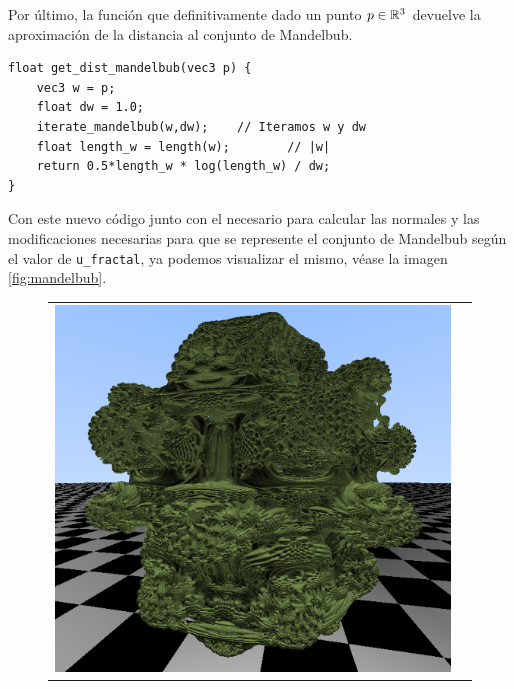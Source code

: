 Por último, la función que definitivamente dado un punto $p\in\mathbb{R}^3$ devuelve la aproximación de la distancia al conjunto de Mandelbub. 

\begin{lstlisting}
float get_dist_mandelbub(vec3 p) {
    vec3 w = p;
    float dw = 1.0;
    iterate_mandelbub(w,dw);    // Iteramos w y dw
    float length_w = length(w);        // |w|
    return 0.5*length_w * log(length_w) / dw;
}
\end{lstlisting}

Con este nuevo código junto con el necesario para calcular las normales y las modificaciones necesarias para que se represente el conjunto de Mandelbub según el valor de \verb|u_fractal|, ya podemos visualizar el mismo, véase la imagen \ref{fig:mandelbub}. 

\begin{figure}[ht]
    \centering
    \begin{tabular}{cc}
        \includegraphics[scale=0.34]{img/C8/mandelbub-1.png} &

\end{tabular}
\end{figure}
